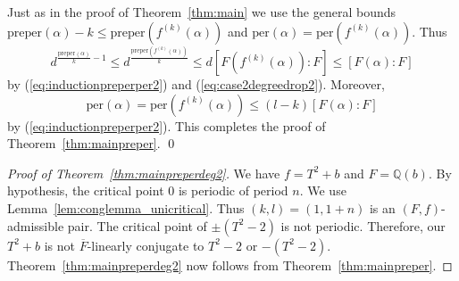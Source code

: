\documentclass[12pt,oneside,a4]{amsart}
\newcommand{\IQ}{\mathbb{Q}}
\numberwithin{maincounter}{section}
\numberwithin{equation}{section}
\begin{document}
Just as in the proof of Theorem~\ref{thm:main} we use the general bounds
$\mathrm{preper}(\alpha)-k\le \mathrm{preper}(f^{(k)}(\alpha))$
and $ \mathrm{per}(\alpha)=\mathrm{per}(f^{(k)}(\alpha))$. Thus
\begin{equation*}
  d^{\frac{\mathrm{preper}(\alpha)}{k}-1} \le 
  d^{\frac{\mathrm{preper}(f^{(k)}(\alpha))}{k}} \le 
  d[F(f^{(k)}(\alpha)):F] \le [F(\alpha):F] 
\end{equation*}
by (\ref{eq:inductionpreperper2}) and (\ref{eq:case2degreedrop2}).
Moreover,
\begin{equation*}
  {\mathrm{per}(\alpha)}
  =  {\mathrm{per}(f^{(k)}(\alpha))}
  \le (l-k) [F(\alpha):F]
\end{equation*}
by (\ref{eq:inductionpreperper2}). This completes the proof of
Theorem~\ref{thm:mainpreper}. \qed

\begin{proof}[Proof of Theorem~\ref{thm:mainpreperdeg2}]
  We have $f=T^2+b$ and $F=\IQ(b)$. By hypothesis, the critical
  point $0$ is periodic of period $n$. We use
  Lemma~\ref{lem:conglemma_unicritical}.
  Thus $(k,l)=(1,1+n)$ is an $(F,f)$-admissible pair.
  The  critical point of $\pm
  (T^2-2)$ is not 
  periodic. Therefore, our $T^2+b$ is not $\overline F$-linearly
  conjugate to $T^2-2$ or $-(T^2-2)$.  Theorem~\ref{thm:mainpreperdeg2}
  now follows from Theorem~\ref{thm:mainpreper}.
\end{proof}
\end{document}
